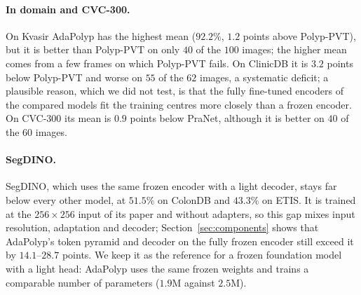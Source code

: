 \documentclass{ieeeaccess}
\begin{document}
\paragraph{In domain and CVC-300.} On Kvasir AdaPolyp has the highest mean ($92.2\%$, $1.2$ points above Polyp-PVT), but it is better than Polyp-PVT on only $40$ of the $100$ images; the higher mean comes from a few frames on which Polyp-PVT fails. On ClinicDB it is $3.2$ points below Polyp-PVT and worse on $55$ of the $62$ images, a systematic deficit; a plausible reason, which we did not test, is that the fully fine-tuned encoders of the compared models fit the training centres more closely than a frozen encoder. On CVC-300 its mean is $0.9$ points below PraNet, although it is better on $40$ of the $60$ images.

\paragraph{SegDINO.} SegDINO, which uses the same frozen encoder with a light decoder, stays far below every other model, at $51.5\%$ on ColonDB and $43.3\%$ on ETIS. It is trained at the $256\times256$ input of its paper and without adapters, so this gap mixes input resolution, adaptation and decoder; Section~\ref{sec:components} shows that AdaPolyp's token pyramid and decoder on the fully frozen encoder still exceed it by $14.1$--$28.7$ points. We keep it as the reference for a frozen foundation model with a light head: AdaPolyp uses the same frozen weights and trains a comparable number of parameters ($1.9$M against $2.5$M).

\begin{table}[!t]
  \centering
  \caption{\textbf{Paired tests of AdaPolyp against each retrained model} on the primary cohorts. \mbox{\unboldmath$\Delta$}: mean Dice difference (pp, AdaPolyp minus model) over $5$ matched seeds; $p_{\text{seed}}$: paired $t$-test over seeds; $p_{\text{img}}$: Wilcoxon signed-rank test over images on seed-averaged Dice, with the number of images on which AdaPolyp is better/worse; descriptive only, because frames from one video are not independent. All $p$-values Holm-corrected over the three cohorts.}
  \label{tab:stats}
  \vspace{2pt}
  \setlength{\tabcolsep}{6pt}\footnotesize{}
\end{table}
\end{document}
